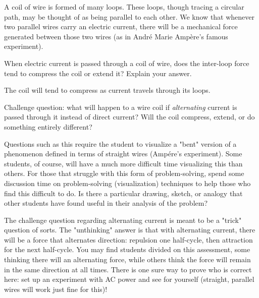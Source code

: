 

A coil of wire is formed of many loops.  These loops, though tracing a circular path, may be thought of as being parallel to each other.  We know that whenever two parallel wires carry an electric current, there will be a mechanical force generated between those two wires (as in Andr\'e Marie Amp\`ere's famous experiment).

When electric current is passed through a coil of wire, does the inter-loop force tend to compress the coil or extend it?  Explain your answer.







The coil will tend to compress as current travels through its loops.

\vskip 10pt

Challenge question: what will happen to a wire coil if {\it alternating} current is passed through it instead of direct current?  Will the coil compress, extend, or do something entirely different?







Questions such as this require the student to visualize a "bent" version of a phenomenon defined in terms of straight wires (Amp\'ere's experiment).  Some students, of course, will have a much more difficult time visualizing this than others.  For those that struggle with this form of problem-solving, spend some discussion time on problem-solving (visualization) techniques to help those who find this difficult to do.  Is there a particular drawing, sketch, or analogy that other students have found useful in their analysis of the problem?

The challenge question regarding alternating current is meant to be a "trick" question of sorts.  The "unthinking" answer is that with alternating current, there will be a force that alternates direction: repulsion one half-cycle, then attraction for the next half-cycle.  You may find students divided on this assessment, some thinking there will an alternating force, while others think the force will remain in the same direction at all times.  There is one sure way to prove who is correct here: set up an experiment with AC power and see for yourself (straight, parallel wires will work just fine for this)!




